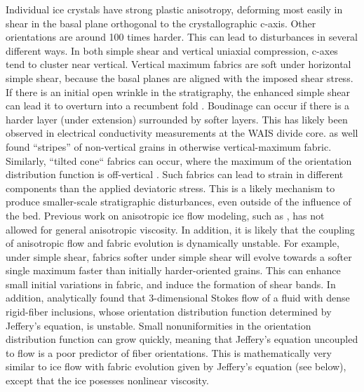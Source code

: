 \documentclass{report}
\begin{document}
Individual ice crystals have strong plastic anisotropy, deforming most easily in shear in the basal plane orthogonal to the crystallographic c-axis. Other orientations are around 100 times harder. This can lead to disturbances in several different ways. In both simple shear and vertical uniaxial compression, c-axes tend to cluster near vertical. Vertical maximum fabrics are soft under horizontal simple shear, because the basal planes are aligned with the imposed shear stress. If there is an initial open wrinkle in the stratigraphy, the enhanced simple shear can lead it to overturn into a recumbent fold \citep{throstur2002}. Boudinage can occur if there is a harder layer (under extension) surrounded by softer layers. This has likely been observed in electrical conductivity measurements at the WAIS divide core. \citet{alley97} as well found ``stripes'' of non-vertical grains in otherwise vertical-maximum fabric. Similarly, ``tilted cone`` fabrics can occur, where the maximum of the orientation distribution function is off-vertical \citep{throstur2002}. Such fabrics can lead to strain in different components than the applied deviatoric stress. This is a likely mechanism to produce smaller-scale stratigraphic disturbances, even outside of the influence of the bed. Previous work on anisotropic ice flow modeling, such as \citet{gillet2005}, has not allowed for general anisotropic viscosity. In addition, it is likely that the coupling of anisotropic flow and fabric evolution is dynamically unstable. For example, under simple shear, fabrics softer under simple shear will evolve towards a softer single maximum faster than initially harder-oriented grains. This can enhance small initial variations in fabric, and induce the formation of shear bands. In addition, \citet{montgomery-smith2011} analytically found that 3-dimensional Stokes flow of a fluid with dense rigid-fiber inclusions, whose orientation distribution function determined by Jeffery's equation, is unstable. Small nonuniformities in the orientation distribution function can grow quickly, meaning that Jeffery's equation uncoupled to flow is a poor predictor of fiber orientations. This is mathematically very similar to ice flow with fabric evolution given by Jeffery's equation (see below), except that the ice posesses nonlinear viscosity.
\end{document}
